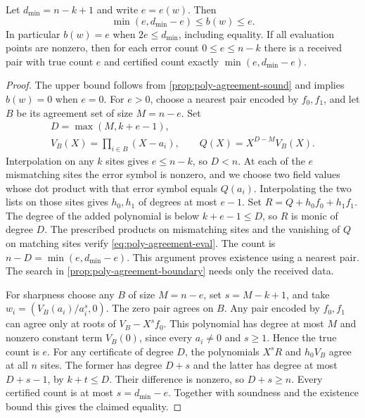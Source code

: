 \begin{theorem}
\label{thm:poly-agreement-complete}
Let \(d_{\min}=n-k+1\) and write \(e=e(w)\). Then
\[
  \min(e,d_{\min}-e)\le b(w)\le e.
\]
In particular \(b(w)=e\) when \(2e\le d_{\min}\), including equality.
If all evaluation points are nonzero, then for each error count
\(0\le e\le n-k\) there is a received pair with true count \(e\) and
certified count exactly \(\min(e,d_{\min}-e)\).
\end{theorem}
\begin{proof}
The upper bound follows from \cref{prop:poly-agreement-sound} and implies
\(b(w)=0\) when \(e=0\). For \(e>0\), choose a nearest pair encoded by
\(f_0,f_1\), and let \(B\) be its agreement set of size \(M=n-e\). Set
\[
  \begin{gathered}
    D=\max(M,k+e-1),\\
    V_B(X)=\prod_{i\in B}(X-a_i),\qquad Q(X)=X^{D-M}V_B(X).
  \end{gathered}
\]
Interpolation on any \(k\) sites gives \(e\le n-k\), so \(D<n\).
At each of the \(e\) mismatching sites the error symbol is nonzero, and we
choose two field values whose dot product with that error symbol equals
\(Q(a_i)\). Interpolating the two lists on those sites gives \(h_0,h_1\) of
degrees at most \(e-1\). Set \(R=Q+h_0f_0+h_1f_1\). The degree of the
added polynomial is below \(k+e-1\le D\), so \(R\) is monic of degree
\(D\). The prescribed products on mismatching sites and the vanishing of
\(Q\) on matching sites verify \cref{eq:poly-agreement-eval}. The count is
\(n-D=\min(e,d_{\min}-e)\). This argument proves existence using a nearest
pair. The search in \cref{prop:poly-agreement-boundary} needs only the
received data.

For sharpness choose any \(B\) of size \(M=n-e\), set \(s=M-k+1\), and
take \(w_i=(V_B(a_i)/a_i^s,0)\). The zero pair agrees on \(B\). Any pair
encoded by \(f_0,f_1\) can agree only at roots of \(V_B-X^sf_0\). This
polynomial has degree at most \(M\) and nonzero constant term \(V_B(0)\),
since every \(a_i\ne0\) and \(s\ge1\). Hence the true count is \(e\).
For any certificate of degree \(D\), the polynomials \(X^sR\) and
\(h_0V_B\) agree at all \(n\) sites. The former has degree \(D+s\) and
the latter has degree at most \(D+s-1\), by \(k+t\le D\). Their difference
is nonzero, so \(D+s\ge n\). Every certified count is at most
\(s=d_{\min}-e\). Together with soundness and the existence bound this
gives the claimed equality.
\end{proof}

